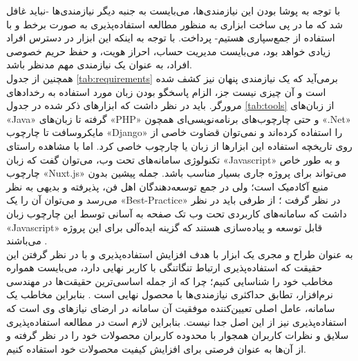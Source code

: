 با توجه به پوشا بودن این نیازمندی‌ها، می‌بایست به جنبه دیگر نیازمندی‌ها -نباید غافل شد که ما در پی ساخت ابزاری به منظور مطالعه استفاده‌پذیری به صورت برخط و با استفاده از جمع‌سپاری هستیم- پرداخت. با توجه به اینکه این ابزار در دسترس افراد زیادی خواهد بود، می‌بایست مدیریت حساب، احراز هویت، و حفظ حریم خصوصی افراد، به عنوان یک نیازمندی مهم مدنظر باشد.\\
همچنین از جدول
\ref{tab:requirements}
برمی‌آید که یک نیازمندی پنهان نیز کشف شده است و آن چیزی نیست جز، الزام پاسخگو بودن زبان مورد استفاده به رخدادهای مرورگر. باید در نظر داشت که ابزارهای ذکر شده در جدول
\ref{tab:tools}
از زبان‌های
«Java»
گرفته تا زبان‌های
«PHP»
و حتی چارچوب‌های برنامه‌نویسی‌ای
همچون
«.Net»
مایکروسافت تا چارچوب
«Django»
را استفاده کرده‌اند و نمی‌توان قضاوت خاصی از روی تاریخچه استفاده این ابزارها از زبان یا چارچوب خاصی کرد. اما با مشاهده راستای
تکنولوژی سامانه‌های تحت وب، می‌توان گفت که زبان
«Javascript»
و به طور خاص چارچوب
«Nuxt.js»
می‌تواند برای پروژه جاری بسیار مناسب باشد. جمله پیشین بدون منبع آکادمیک است؛ ولی در جمع توسعه‌دهندگان اهل فن، پذیرفته و بدیهی به نظر می‌رسد و می‌توان آن را یک
«Best-Practice»
در نظر گرفت
\cite{noauthor_curated_2018, sozo_10_2018, noauthor_creating_nodate}؛
از طرفی  باید در نظر داشت که سامانه‌های کاربردی تحت وب تک صفحه
به آسانی توسط این چارچوب زبان
«Javascript»
قابل توسعه و پیاده‌سازی هستند که گزینه ایده‌آلی برای این پروژه می‌باشند
\cite{ardalis_choose_nodate, neoteric_single-page_2016}.\\
به عنوان طراح و مجری یک ابزار با هدف افزایش استفاده‌پذیری و با در نظر گرفتن این حقیقت که استفاده‌پذیری ارتباط تنگاتنگی با کاربر نهایی دارد، می‌بایست همواره مخاطب خود را شناسایی کنیم؛ چرا که از جمله‌ اساسی‌ترین حقیقت‌ها در مهندسی نرم‌افزار، تطابق حداکثری نیازمندی‌ها با محصول نهایی است
\cite{sommerville_software_2016}.
بنابراین مخاطب یک سامانه، عامل اصلی تعیین‌کننده موفقیت آن سامانه در ارضای نیازهای وی است که استفاده‌پذیری نیز از این اصل جدا نیست. بنابراین لازم است در مطالعه استفاده‌پذیری سلایق و نظرات کاربران همجوار با محدوده کاربران محصولات خود را در نظر گرفته و از آن‌ها به عنوان فرصتی برای افزایش کیفیت محصولات خود استفاده کنیم.\\
